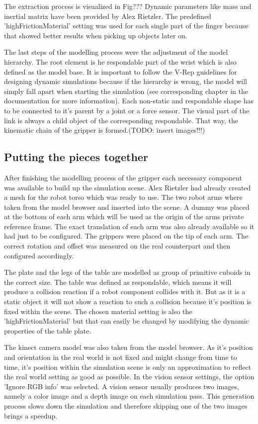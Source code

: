 The extraction process is visualized in Fig???
Dynamic parameters like mass and inertial matrix have been provided by Alex Rietzler. The predefined 'highFrictionMaterial' setting was used for each single part of the finger because that showed better results when picking up objects later on.

The last steps of the modelling process were the adjustment of the model hierarchy. The root element is he respondable part of the wrist which is also defined as the model base. It is important to follow the V-Rep guidelines for designing dynamic simulations because if the hierarchy is wrong, the model will simply fall apart when starting the simulation (see corresponding chapter in the documentation for more information). Each non-static and respondable shape has to be connected to it's parent by a joint or a force sensor. The visual part of the link is always a child object of the corresponding respondable. That way, the kinematic chain of the gripper is formed.(TODO: insert images!!!)


\subsection{Putting the pieces together}

After finishing the modelling process of the gripper each necessary component was available to build up the simulation scene. Alex Rietzler had already created a mesh for the robot torso which was ready to use. The two robot arms where taken from the model browser and inserted into the scene. A dummy was placed at the bottom of each arm which will be used as the origin of the arms private reference frame. The exact translation of each arm was also already available so it had just to be configured. The grippers were placed on the tip of each arm. The correct rotation and offset was measured on the real counterpart and then configured accordingly. 

The plate and the legs of the table are modelled as group of primitive cuboids in the correct size. The table was defined as respondable, which means it will produce a collision reaction if a robot component collides with it. But as it is a static object it will not show a reaction to such a collision because it's position is fixed within the scene. The chosen material setting is also the 'highFrictionMaterial' but that can easily be changed by modifying the dynamic properties of the table plate.

The kinect camera model was also taken from the model browser. As it's position and orientation in the real world is not fixed and might change from time to time, it's position within the simulation scene is only an approximation to reflect the real world setting as good as possible. In the vision sensor settings, the option 'Ignore RGB info' was selected. A vision sensor usually produces two images, namely a color image and a depth image on each simulation pass. This generation process slows down the simulation and therefore skipping one of the two images brings a speedup.

